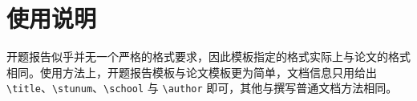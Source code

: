 \documentclass[class=opening]{whuthesis}
\begin{document}
\section{使用说明}
开题报告似乎并无一个严格的格式要求，因此模板指定的格式实际上与论文的格式相同。使用方法上，开题报告模板与论文模板更为简单，文档信息只用给出 \verb|\title|、\verb|\stunum|、\verb|\school| 与 \verb|\author| 即可，其他与撰写普通文档方法相同。

\nocite{*}
\end{document}
